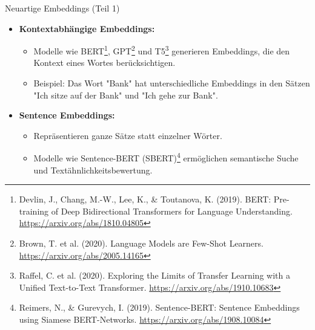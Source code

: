 \documentclass[aspectratio=1610, xcolor=dvipsnames, 9pt]{beamer}
\begin{document}
\begin{frame}{Neuartige Embeddings (Teil 1)}
  \begin{itemize}
    \item \textbf{Kontextabhängige Embeddings:}
      \begin{itemize}
        \item Modelle wie BERT\footnote{Devlin, J., Chang, M.-W., Lee, K., \& Toutanova, K. (2019). BERT: Pre-training of Deep Bidirectional Transformers for Language Understanding. \url{https://arxiv.org/abs/1810.04805}}, GPT\footnote{Brown, T. et al. (2020). Language Models are Few-Shot Learners. \url{https://arxiv.org/abs/2005.14165}} und T5\footnote{Raffel, C. et al. (2020). Exploring the Limits of Transfer Learning with a Unified Text-to-Text Transformer. \url{https://arxiv.org/abs/1910.10683}} generieren Embeddings, die den Kontext eines Wortes berücksichtigen.
        \item Beispiel: Das Wort "Bank" hat unterschiedliche Embeddings in den Sätzen "Ich sitze auf der Bank" und "Ich gehe zur Bank".
      \end{itemize}
    \item \textbf{Sentence Embeddings:}
      \begin{itemize}
        \item Repräsentieren ganze Sätze statt einzelner Wörter.
        \item Modelle wie Sentence-BERT (SBERT)\footnote{Reimers, N., \& Gurevych, I. (2019). Sentence-BERT: Sentence Embeddings using Siamese BERT-Networks. \url{https://arxiv.org/abs/1908.10084}} ermöglichen semantische Suche und Textähnlichkeitsbewertung.
      \end{itemize}
  \end{itemize}
\end{frame}
\end{document}
